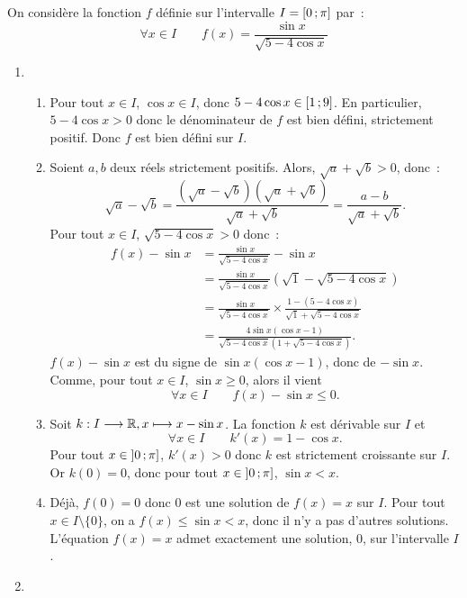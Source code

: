 \begin{exercice}[Problème]
    On considère la fonction \(f\) définie sur l'intervalle \(I = \left[ 0 \, ;  \pi \right]\) par~:
    \begin{equation*}
        \forall x \in I \qquad f(x) = \frac{\sin x}{\sqrt{5-4\cos x}}
    \end{equation*}
    \begin{enumerate}
        \item
            \begin{enumerate}
                \item Pour tout \(x \in I\), \(\cos x \in I\), donc \(5-4\cos x \in \left[ 1 \, ;  9 \right]\). En particulier, \(5-4\cos x >0\) donc le dénominateur de \(f\) est bien défini, strictement positif. Donc \(f\) est bien défini sur \(I\).
                \item Soient \(a, b\) deux réels strictement positifs. Alors, \(\sqrt{a}+\sqrt{b} >0\), donc~:
                    \begin{equation*}
                        \sqrt{a}-\sqrt{b} = \frac{(\sqrt{a}-\sqrt{b})(\sqrt{a}+\sqrt{b})}{\sqrt{a}+\sqrt{b}} = \frac{a-b}{\sqrt{a}+\sqrt{b}}.
                    \end{equation*}
                Pour tout \(x \in I\), \(\sqrt{5-4\cos x}>0\) donc~:
                \begin{align*}
                    f(x)-\sin x &=\frac{\sin x}{\sqrt{5-4\cos x}} - \sin x \\
                                &=\frac{\sin x}{\sqrt{5-4\cos x}}(\sqrt{1}- \sqrt{5-4\cos x}) \\
                                &=\frac{\sin x}{\sqrt{5-4\cos x}} \times \frac{1-(5-4\cos x)}{\sqrt{1}+\sqrt{5-4\cos x}} \\
                                &=\frac{4\sin x (\cos x -1)}{\sqrt{5-4\cos x}(1+\sqrt{5-4\cos x})}.
                \end{align*}
                \(f(x)-\sin x\) est du signe de \(\sin x (\cos x -1)\), donc de \(-\sin x\). Comme, pour tout \(x \in I\), \(\sin x \geq 0\), alors il vient
                \begin{equation*}
                    \forall x \in I \qquad f(x)-\sin x \leq 0.
                \end{equation*}
            \item Soit \(k:I \longrightarrow \mathbb{R}, x \longmapsto x-\sin x\). La fonction \(k\) est dérivable sur \(I\) et \[\forall x \in I \qquad k'(x) = 1-\cos x.\]
                Pour tout \(x \in \left] 0 \, ;  \pi \right]\), \(k'(x)>0\) donc \(k\) est strictement croissante sur \(I\). Or \(k(0)=0\), donc pour tout \(x \in \left] 0 \, ;  \pi \right]\), \(\sin x < x\).
            \item Déjà, \(f(0)=0\) donc \(0\) est une solution de \(f(x)=x\) sur \(I\). Pour tout \(x \in I\setminus\{0\}\), on a \(f(x) \leq \sin x < x\), donc il n'y a pas d'autres solutions. L'équation \(f(x)=x\) admet exactement une solution, \(0\), sur l'intervalle \(I\).
            \end{enumerate}
        \item 
    \end{enumerate}    
\end{exercice}
